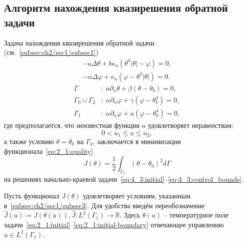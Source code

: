 \subsection{Алгоритм нахождения квазирешения обратной задачи}
\label{subsec:ch4/sec3/boundary}

Задача нахождения квазирешения обратной
задачи (см.~\ref{subsec:ch2/sec1/subsec1})
\begin{equation}
    \label{eq:4_3:initial}
    \begin{aligned}
        - a \Delta \theta + b \kappa_a(\theta ^ 3 | \theta | - \varphi) = 0,  \\
        - \alpha \Delta \varphi + \kappa_a (\varphi - \theta ^3 | \theta |) = 0.
    \end{aligned}
\end{equation}
\begin{equation}
    \label{eq:4_3:initial-boundary}
    \begin{aligned}
        \Gamma &: \; a \partial_n \theta + \beta (\theta - \theta _b) = 0, \\
        \Gamma_0 \cup \Gamma_2 &: \; \alpha \partial_n \varphi
        + \gamma(\varphi - \theta_b ^4 ) = 0, \\
        \Gamma_1 &: \; \alpha \partial_n \varphi + u(\varphi - \theta_b ^4 ) = 0,
    \end{aligned}
\end{equation}
где предполагается, что неизвестная функция $u$ удовлетворяет неравенствам:
\begin{equation}
    \label{eq:4_3:control_bounds}
    0 < u_1 \leq u \leq u_2,
\end{equation}
а также условию $\theta = \theta_0$ на $\Gamma_2$,
заключается в минимизации функционала~\eqref{eq:2_1:quality}
\begin{equation}
    \label{eq:4_3:quality}
    J(\theta) = \frac{1}{2} \int_{\Gamma_2} (\theta - \theta_0)^2 d\Gamma
\end{equation}
на решениях начально-краевой задачи~\eqref{eq:4_3:initial}--\eqref{eq:4_3:control_bounds}.

Пусть функционал $J(\theta)$ удовлетворяет условиям,
указанным в~\autoref{subsec:ch2/sec1/subsec3}.
Для удобства введём переобозначение
$\hat{J}(u)\coloneqq J(\theta(u)), \hat{J}:L^2(\Gamma_1) \to \mathbb{R}$.
Здесь $\theta(u)$ -- температурное поле
задачи~\eqref{eq:2_1:initial}--\eqref{eq:2_1:initial-boundary}
отвечающее управлению $u \in L^2(\Gamma_1)$.

